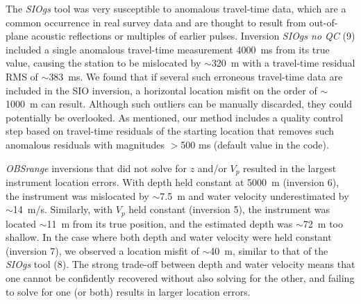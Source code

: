 The \textit{SIOgs} tool was very susceptible to anomalous travel-time data, which are a common occurrence in real survey data and are thought to result from out-of-plane acoustic reflections or multiples of earlier pulses. Inversion \textit{SIOgs no QC} (9) included a single anomalous travel-time measurement 4000~ms from its true value, causing the station to be mislocated by $\sim$320~m with a travel-time residual RMS of $\sim$383~ms. We found that if several such erroneous travel-time data are included in the SIO inversion, a horizontal location misfit on the order of $\sim$1000~m can result. Although such outliers can be manually discarded, they could potentially be overlooked. As mentioned, our method includes a quality control step based on travel-time residuals of the starting location that removes such anomalous residuals with magnitudes $>$500 ms (default value in the code).

\textit{OBSrange} inversions that did not solve for $z$ and/or $V_p$ resulted in the largest instrument location errors. With depth held constant at 5000~m (inversion 6), the instrument was mislocated by $\sim$7.5~m and water velocity underestimated by $\sim$14~m/s. Similarly, with $V_p$ held constant (inversion 5), the instrument was located $\sim$11~m from its true position, and the estimated depth was $\sim$72~m too shallow. In the case where both depth and water velocity were held constant (inversion 7), we observed a location misfit of $\sim$40~m, similar to that of the \textit{SIOgs} tool (8). The strong trade-off between depth and water velocity means that one cannot be confidently recovered without also solving for the other, and failing to solve for one (or both) results in larger location errors.

